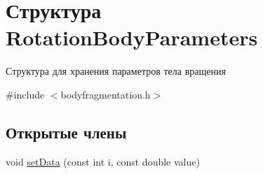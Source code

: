 \hypertarget{struct_rotation_body_parameters}{}\section{Структура Rotation\+Body\+Parameters}
\label{struct_rotation_body_parameters}


Структура для хранения параметров тела вращения  




{\ttfamily \#include $<$bodyfragmentation.\+h$>$}

\subsection*{Открытые члены}
\begin{DoxyCompactItemize}
\item 
void \mbox{\hyperlink{struct_rotation_body_parameters_a0e0a77e37999193d1605464f2fee3b5c}{set\+Data}} (const int i, const double value)
\end{DoxyCompactItemize}
